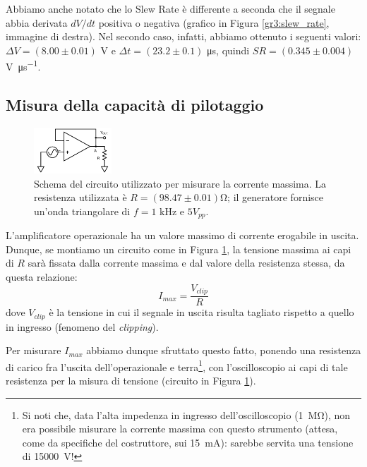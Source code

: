 Abbiamo anche notato che lo Slew Rate è differente a seconda che il segnale abbia derivata $dV/dt$ positiva o negativa (grafico in Figura \ref{gr3:slew_rate}, immagine di destra). Nel secondo caso, infatti, abbiamo ottenuto i seguenti valori: $\Delta V = (8.00 \pm 0.01)$ \si{\volt} e $\Delta t = (23.2 \pm 0.1)$ \si{\micro\second}, quindi $SR = (0.345 \pm 0.004)$ \si{\volt\per\micro\second}.

\subsection{Misura della capacità di pilotaggio}

\begin{figure}
  \begin{center}
    \includegraphics[width=0.26\textwidth]{../E03/latex/max_current.pdf}
  \end{center}
  \caption{Schema del circuito utilizzato per misurare la corrente massima. La resistenza utilizzata è $R=(98.47\pm0.01)$\si{\ohm}; il generatore fornisce un'onda triangolare di $f=1$ \si{\kilo\hertz} e $5 V_{pp}$.}
  \label{cir3:max_current}
\end{figure}

L'amplificatore operazionale ha un valore massimo di corrente erogabile in uscita. Dunque, se montiamo un circuito come in Figura \ref{cir3:max_current}, la tensione massima ai capi di $R$ sarà fissata dalla corrente massima e dal valore della resistenza stessa, da questa relazione:
\begin{equation*}
	I_{max} = \frac{V_{clip}}{R}
\end{equation*}
dove $V_{clip}$ è la tensione in cui il segnale in uscita risulta tagliato rispetto a quello in ingresso (fenomeno del \textit{clipping}).

Per misurare $I_{max}$ abbiamo dunque sfruttato questo fatto, ponendo una resistenza di carico fra l'uscita dell'operazionale e terra\footnote{Si noti che, data l'alta impedenza in ingresso dell'oscilloscopio (\SI{1}{\mega\ohm}), non era possibile misurare la corrente massima con questo strumento (attesa, come da specifiche del costruttore, sui \SI{15}{\milli\ampere}): sarebbe servita una tensione di \SI{15000}{\volt}!}, con l'oscilloscopio ai capi di tale resistenza per la misura di tensione (circuito in Figura \ref{cir3:max_current}).

